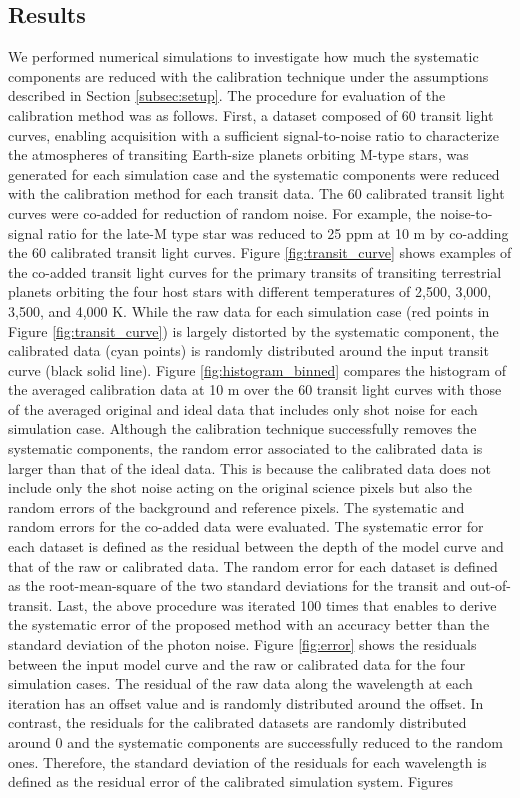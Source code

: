 \documentclass{aastex62}
\begin{document}
\subsection{Results} \label{subsec:results}

We performed numerical simulations to investigate how much the systematic components are reduced with the calibration technique under the assumptions described in Section \ref{subsec:setup}. The procedure for evaluation of the calibration method was as follows. First, a dataset composed of 60 transit light curves, enabling acquisition with a sufficient signal-to-noise ratio to characterize the atmospheres of transiting Earth-size planets orbiting M-type stars, was generated for each simulation case and the systematic components were reduced with the calibration method for each transit data. The 60 calibrated transit light curves were co-added for reduction of random noise. For example, the noise-to-signal ratio for the late-M type star was reduced to 25 ppm at 10 \textmu m by co-adding the 60 calibrated transit light curves. Figure \ref{fig:transit_curve} shows examples of the co-added transit light curves for the primary transits of transiting terrestrial planets orbiting the four host stars with different temperatures of 2,500, 3,000, 3,500, and 4,000 K. While the raw data for each simulation case (red points in Figure \ref{fig:transit_curve}) is largely distorted by the systematic component, the calibrated data (cyan points) is randomly distributed around the input transit curve (black solid line). Figure \ref{fig:histogram_binned} compares the histogram of the averaged calibration data at 10 \textmu m over the 60 transit light curves with those of the averaged original and ideal data that includes only shot noise for each simulation case. Although the calibration technique successfully removes the systematic components, the random error associated to the calibrated data is larger than that of the ideal data. This is because the calibrated data does not include only the shot noise acting on the original science pixels but also the random errors of the background and reference pixels. The systematic and random errors for the co-added data were evaluated. The systematic error for each dataset is defined as the residual between the depth of the model curve and that of the raw or calibrated data. The random error for each dataset is defined as the root-mean-square of the two standard deviations for the transit and out-of-transit. Last, the above procedure was iterated 100 times that enables to derive the systematic error of the proposed method with an accuracy better than the standard deviation of the photon noise. Figure \ref{fig:error} shows the residuals between the input model curve and the raw or calibrated data for the four simulation cases. The residual of the raw data along the wavelength at each iteration has an offset value and is randomly distributed around the offset. In contrast, the residuals for the calibrated datasets are randomly distributed around 0 and the systematic components are successfully reduced to the random ones. Therefore, the standard deviation of the residuals for each wavelength is defined as the residual error of the calibrated simulation system. Figures 
\end{document}
